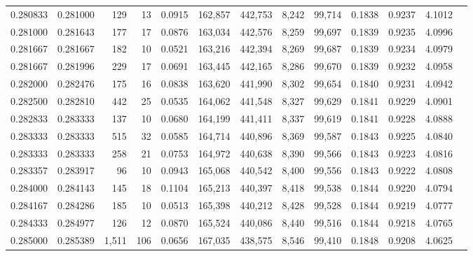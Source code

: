 \begin{tabular}{rrrrrrrrrrrrr}
0.280833 & 0.281000 &   129 &  13 &                                     0.0915 & 162,857 & 442,753 &   8,242 &  99,714 & 0.1838 & 0.9237 & 4.1012 \\
0.281000 & 0.281643 &   177 &  17 &                                     0.0876 & 163,034 & 442,576 &   8,259 &  99,697 & 0.1839 & 0.9235 & 4.0996 \\
0.281667 & 0.281667 &   182 &  10 &                                     0.0521 & 163,216 & 442,394 &   8,269 &  99,687 & 0.1839 & 0.9234 & 4.0979 \\
0.281667 & 0.281996 &   229 &  17 &                                     0.0691 & 163,445 & 442,165 &   8,286 &  99,670 & 0.1839 & 0.9232 & 4.0958 \\
0.282000 & 0.282476 &   175 &  16 &                                     0.0838 & 163,620 & 441,990 &   8,302 &  99,654 & 0.1840 & 0.9231 & 4.0942 \\
0.282500 & 0.282810 &   442 &  25 &                                     0.0535 & 164,062 & 441,548 &   8,327 &  99,629 & 0.1841 & 0.9229 & 4.0901 \\
0.282833 & 0.283333 &   137 &  10 &                                     0.0680 & 164,199 & 441,411 &   8,337 &  99,619 & 0.1841 & 0.9228 & 4.0888 \\
0.283333 & 0.283333 &   515 &  32 &                                     0.0585 & 164,714 & 440,896 &   8,369 &  99,587 & 0.1843 & 0.9225 & 4.0840 \\
0.283333 & 0.283333 &   258 &  21 &                                     0.0753 & 164,972 & 440,638 &   8,390 &  99,566 & 0.1843 & 0.9223 & 4.0816 \\
0.283357 & 0.283917 &    96 &  10 &                                     0.0943 & 165,068 & 440,542 &   8,400 &  99,556 & 0.1843 & 0.9222 & 4.0808 \\
0.284000 & 0.284143 &   145 &  18 &                                     0.1104 & 165,213 & 440,397 &   8,418 &  99,538 & 0.1844 & 0.9220 & 4.0794 \\
0.284167 & 0.284286 &   185 &  10 &                                     0.0513 & 165,398 & 440,212 &   8,428 &  99,528 & 0.1844 & 0.9219 & 4.0777 \\
0.284333 & 0.284977 &   126 &  12 &                                     0.0870 & 165,524 & 440,086 &   8,440 &  99,516 & 0.1844 & 0.9218 & 4.0765 \\
0.285000 & 0.285389 & 1,511 & 106 &                                     0.0656 & 167,035 & 438,575 &   8,546 &  99,410 & 0.1848 & 0.9208 & 4.0625 \\

\end{tabular}
